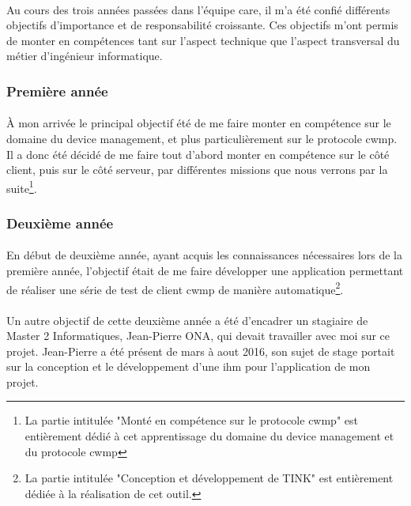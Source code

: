 \documentclass[12pt,a4paper]{report}
\begin{document}
\paragraph*{}Au cours des trois années passées dans l'équipe \gls{care}, il m'a été confié différents objectifs d'importance et de responsabilité croissante. Ces objectifs m'ont permis de monter en compétences tant sur l'aspect technique que l'aspect transversal du métier d'ingénieur informatique.\\
\subsubsection{Première année}
\paragraph*{}À mon arrivée le principal objectif été de me faire monter en compétence sur le domaine du device management, et plus particulièrement sur le protocole \gls{cwmp}. Il a donc été décidé de me faire tout d'abord monter en compétence sur le côté client, puis sur le côté serveur, par différentes missions que nous verrons par la suite\footnote{La partie intitulée "Monté en compétence sur le protocole \gls{cwmp}" est entièrement dédié à cet apprentissage du domaine du device management et du protocole \gls{cwmp}}. \\
\subsubsection{Deuxième année}
\paragraph*{}En début de deuxième année, ayant acquis les connaissances nécessaires lors de la première année, l'objectif était de me faire développer une application permettant de réaliser une série de test de client \gls{cwmp} de manière automatique\footnote{La partie intitulée "Conception et développement de TINK" est entièrement dédiée à la réalisation de cet outil.}.
\paragraph*{}Un autre objectif de cette deuxième année a été d'encadrer un stagiaire de Master 2 Informatiques, Jean-Pierre ONA, qui devait travailler avec moi sur ce projet. Jean-Pierre a été présent de mars à aout 2016, son sujet de stage portait sur la conception et le développement d'une \gls{ihm} pour l'application de mon projet.
\end{document}
